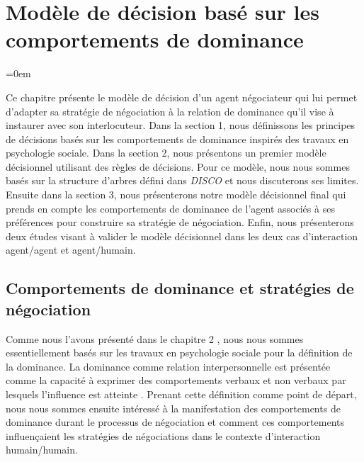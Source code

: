 \chapter{Modèle de décision basé sur les comportements de dominance}
	\label{chap:dec}
	
	\begingroup
	\parindent=0em
	\localtableofcontents 
	\clearpage
	\endgroup
	
	Ce chapitre présente le modèle de décision d'un agent négociateur qui lui permet d'adapter sa stratégie de négociation à la relation de dominance qu'il vise à instaurer avec son interlocuteur. Dans la section 1, nous définissons les principes de décisions basés sur les comportements de dominance inspirés des travaux en psychologie sociale. Dans la section 2, nous présentons un premier modèle décisionnel utilisant des règles de décisions.  Pour ce modèle, nous nous sommes basés sur la structure d'arbres défini dans \emph{DISCO} \cite{rich09} et nous discuterons ses limites. Ensuite dans la section 3, nous présenterons notre modèle décisionnel final qui prends en compte les comportements de dominance de l'agent associés à ses préférences pour construire sa stratégie de négociation. Enfin, nous présenterons deux études visant à valider le modèle décisionnel dans les deux cas d'interaction agent/agent et agent/humain.
	
	\section{Comportements de dominance et stratégies de négociation}
	\label{chap:domer}
	Comme nous l'avons présenté dans le chapitre 2  %
	, nous nous sommes essentiellement basés sur les travaux en psychologie sociale pour la définition de la dominance. 
	La dominance comme relation interpersonnelle est présentée comme la capacité à exprimer des comportements verbaux et non verbaux par lesquels l'influence est atteinte \cite{burgoon2006nonverbal}. Prenant cette définition comme point de départ, nous nous sommes ensuite intéressé à la manifestation des comportements de dominance durant le processus de négociation et comment ces comportements influençaient les stratégies de négociations dans le contexte d'interaction humain/humain. 
	
